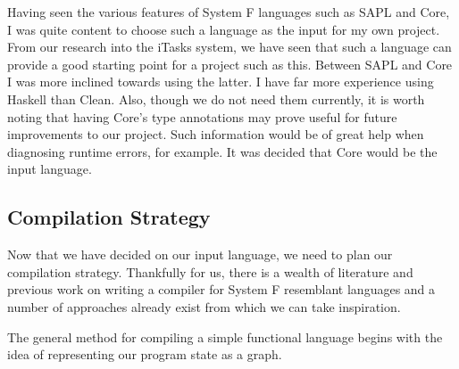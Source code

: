 \documentclass[11pt]{article}
\begin{document}
Having seen the various features of System F languages such as SAPL and Core, I
was quite content to choose such a language as the input for my own project. 
From our research into the iTasks system, we have seen that such a language 
can provide a good starting point for a project such as this. Between SAPL and
Core I was more inclined towards using the latter. I have far more experience
using Haskell than Clean. Also, though we do not need them currently, it is
worth noting that having Core's type annotations may prove useful for future
improvements to our project. Such information would be of great help when 
diagnosing runtime errors, for example. It was decided that Core would be the
input language.

\subsection{Compilation Strategy}
Now that we have decided on our input language, we need to plan our compilation
strategy. Thankfully for us, there is a wealth of literature and previous work
on writing a compiler for System F resemblant languages and a number of approaches
already exist from which we can take inspiration. 

The general method for compiling a simple functional language begins with
the idea of representing our program state as a graph. 
\end{document}
